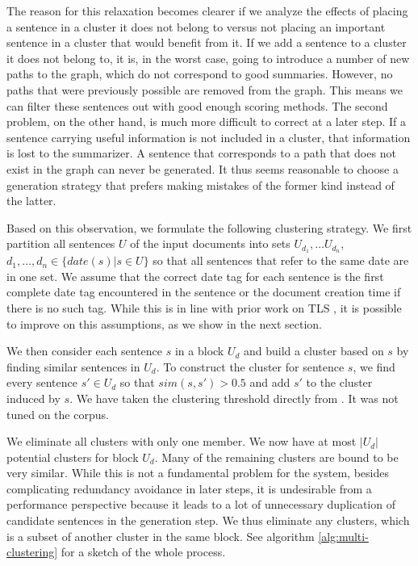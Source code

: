 \documentclass[a4paper,BCOR=10mm]{report}
\numberwithin{lemma}{chapter}
\numberwithin{definition}{chapter}
\begin{document}
The reason for this relaxation becomes clearer if we analyze the effects of placing a sentence in a cluster it does not belong to versus not placing an important sentence in a cluster that would benefit from it.
If we add a sentence to a cluster it does not belong to, it is, in the worst case, going to introduce a number of new paths to the graph, which do not correspond to good summaries. However, no paths that were previously possible are removed from the graph. This means we can filter these sentences out with good enough scoring methods.
The second problem, on the other hand, is much more difficult to correct at a later step. If a sentence carrying useful information is not included in a cluster, that information is lost to the summarizer. A sentence that corresponds to a path that does not exist in the graph can never be generated. It thus seems reasonable to choose a generation strategy that prefers making mistakes of the former kind instead of the latter.

Based on this observation, we formulate the following clustering strategy. We first partition all sentences $U$ of the input documents into sets $U_{d_1}, \dots U_{d_n}$, $d_1, \dots, d_n \in \{ date(s) | s \in U \}$ so that all sentences that refer to the same date are in one set. We assume that the correct date tag for each sentence is the first complete date tag encountered in the sentence or the document creation time if there is no such tag. While this is in line with prior work on TLS \citep{chieu, markert}, it is possible to improve on this assumptions, as we show in the next section.

We then consider each sentence $s$ in a block $U_d$ and build a cluster based on $s$ by finding similar sentences in $U_d$.
To construct the cluster for sentence $s$, we find every sentence $s' \in U_d$ so that $\mathit{sim}(s, s') > 0.5$ and add $s'$ to the cluster induced by $s$. We have taken the clustering threshold directly from \citet{banerjee}. It was not tuned on the corpus.

We eliminate all clusters with only one member. We now have at most $|U_d|$ potential clusters for block $U_d$.
Many of the remaining clusters are bound to be very similar. While this is not a fundamental problem for the system, besides complicating redundancy avoidance in later steps, it is undesirable from a performance perspective because it leads to a lot of unnecessary duplication of candidate sentences in the generation step.
We thus eliminate any clusters, which is a subset of another cluster in the same block. See algorithm \ref{alg:multi-clustering} for a sketch of the whole process.
\end{document}

